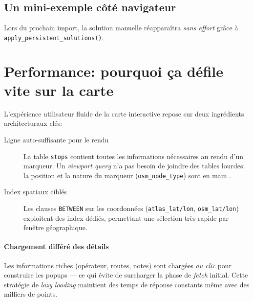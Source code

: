 \subsection*{Un mini-exemple côté navigateur}


\noindent
Lors du prochain import, la solution manuelle réapparaîtra \textit{sans effort} grâce à \texttt{apply\_persistent\_solutions()}.

\section{Performance: pourquoi ça défile vite sur la carte}

L'expérience utilisateur fluide de la carte interactive repose sur deux ingrédients architecturaux clés:

\begin{description}
  \item[Ligne auto-suffisante pour le rendu] La table \texttt{stops} contient toutes les informations nécessaires au rendu d'un marqueur. Un \textit{viewport query} n'a pas besoin de joindre des tables lourdes: la position et la nature du marqueur (\texttt{osm\_node\_type}) sont \og en main \fg{}.
  
  \item[Index spatiaux ciblés] Les clauses \texttt{BETWEEN} sur les coordonnées (\texttt{atlas\_lat/lon}, \texttt{osm\_lat/lon}) exploitent des index dédiés, permettant une sélection très rapide par fenêtre géographique.
\end{description}

\paragraph{Chargement différé des détails} Les informations riches (opérateur, routes, notes) sont chargées \textit{au clic} pour construire les popups — ce qui évite de surcharger la phase de \textit{fetch} initial. Cette stratégie de \textit{lazy loading} maintient des temps de réponse constants même avec des milliers de points.

